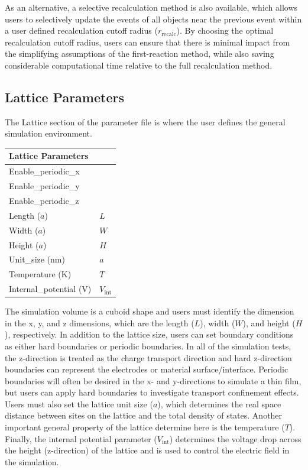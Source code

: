 \documentclass[%
 reprint,onecolumn,notitlepage,
superscriptaddress,longbibliography,
 amsmath,amssymb,
 aps,rmp,floatfix,
]{revtex4-1}
\begin{document}
As an alternative, a selective recalculation method is also available, which allows users to selectively update the events of all objects near the previous event within a user defined recalculation cutoff radius ($r_\text{recalc}$).\cite{heiber2012jcp} 
By choosing the optimal recalculation cutoff radius, users can ensure that there is minimal impact from the simplifying assumptions of the first-reaction method, while also saving considerable computational time relative to the full recalculation method.

\subsection{Lattice Parameters}

The Lattice section of the parameter file is where the user defines the general simulation environment.

\begin{center}
\begin{tabular}{ l l }
\hline
Lattice Parameters & \\
\hline
Enable\_periodic\_x & \\
Enable\_periodic\_y & \\
Enable\_periodic\_z & \\
Length ($a$) & $L$ \\
Width ($a$) & $W$ \\
Height ($a$) & $H$ \\
Unit\_size (nm) & $a$ \\
Temperature (K) & $T$  \\
Internal\_potential (V) & $V_\text{int}$ \\
\end{tabular}
\end{center}

The simulation volume is a cuboid shape and users must identify the dimension in the x, y, and z dimensions, which are the length ($L$), width ($W$), and height ($H$), respectively.
In addition to the lattice size, users can set boundary conditions as either hard boundaries or periodic boundaries. 
In all of the simulation tests, the z-direction is treated as the charge transport direction and hard z-direction boundaries can represent the electrodes or material surface/interface. 
Periodic boundaries will often be desired in the x- and y-directions to simulate a thin film, but users can apply hard boundaries to investigate transport confinement effects.
Users must also set the lattice unit size ($a$), which determines the real space distance between sites on the lattice and the total density of states.
Another important general property of the lattice determine here is the temperature ($T$).
Finally, the internal potential parameter ($V_\text{int}$) determines the voltage drop across the height (z-direction) of the lattice and is used to control the electric field in the simulation. 
\end{document}
